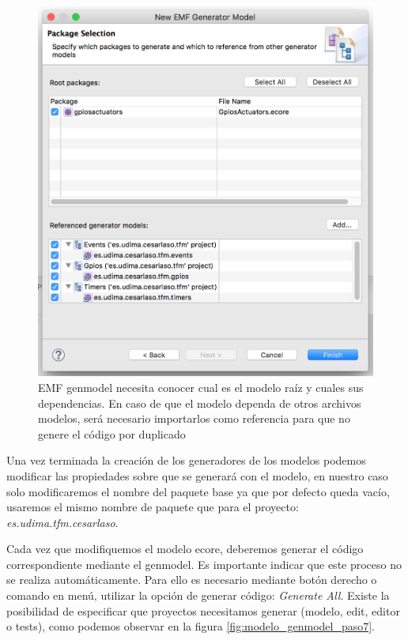 \begin{figure}
	\centering
    \includegraphics[scale=0.4]{images/emf_capturas/genmodel_6.png}
    \sourcepropia{}
    \caption[Genmodel selección de raíz y dependencias]{EMF genmodel necesita conocer cual es el modelo raíz y cuales sus dependencias. En caso de que el modelo dependa de otros archivos modelos, será necesario importarlos como referencia para que no genere el código por duplicado}
    \label{fig:modelo_genmodel_paso6}
\end{figure}



Una vez terminada la creación de los generadores de los modelos podemos modificar las propiedades sobre que se generará con el modelo, en nuestro caso solo modificaremos el nombre del paquete base ya que por defecto queda vacío, usaremos el mismo nombre de paquete que para el proyecto: \textit{es.udima.tfm.cesarlaso}.

Cada vez que modifiquemos el modelo \gls{ecore}, deberemos generar el código correspondiente mediante el genmodel. Es importante indicar que este proceso no se realiza automáticamente. Para ello es necesario mediante botón derecho o comando en menú, utilizar la opción de generar código: \textit{Generate All}. Existe la posibilidad de especificar que proyectos necesitamos generar (modelo, edit, editor o tests), como podemos observar en la figura  \ref{fig:modelo_genmodel_paso7}.

